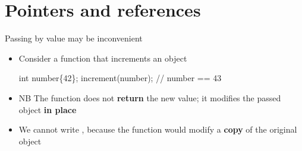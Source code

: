 

\section*{Pointers and references}

\begin{frame}[fragile]{Passing by value may be inconvenient}

  \begin{itemize}
  \item Consider a function that increments an  object

  \begin{codeblock}

int number\{42\};
increment(number);
// number == 43\end{codeblock}

  \item NB The function does not \textbf{return} the new value; it modifies the
    passed object \textbf{in place}

  \item<2-> We cannot write , because the function would
    modify a \textbf{copy} of the original object
  \end{itemize}

\end{frame}

